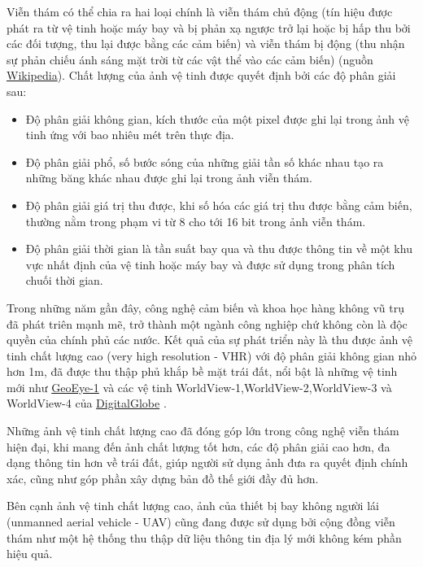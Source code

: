 \documentclass[14pt, oneside, a4paper, openany]{scrartcl}
\begin{document}
Viễn thám có thể chia ra hai loại chính là viễn thám chủ động (tín hiệu được phát ra từ vệ tinh hoặc máy bay và bị phản xạ ngược trở lại hoặc bị hấp thu bởi các đối tượng, thu lại được bằng các cảm biến) và viễn thám bị động (thu nhận sự phản chiếu ánh sáng mặt trời từ các vật thể vào các cảm biến) (nguồn \href{https://en.wikipedia.org/wiki/Remote_sensing}{Wikipedia})\cite{remotesens}.
Chất lượng của ảnh vệ tinh được quyết định bởi các độ phân giải sau:
\begin{itemize}
	\item Độ phân giải không gian, kích thước của một pixel được ghi lại trong ảnh vệ tinh ứng với bao nhiêu mét trên thực địa.
	\item Độ phân giải phổ, số bước sóng của những giải tần số khác nhau tạo ra những băng khác nhau được ghi lại trong ảnh viễn thám.
	\item Độ phân giải giá trị thu được, khi số hóa các giá trị thu được bằng cảm biến, thường nằm trong phạm vi từ 8 cho tới 16 bit trong ảnh viễn thám.
	\item Độ phân giải thời gian là tần suất bay qua và thu được thông tin về một khu vực nhất định của vệ tinh hoặc máy bay và được sử dụng trong phân tích chuối thời gian.
\end{itemize}
Trong những năm gần đây, công nghệ cảm biến và khoa học hàng không vũ trụ đã phát triên mạnh mẽ, trở thành một ngành công nghiệp chứ không còn là độc quyền của chính phủ các nước. Kết quả của sự phát triển này là thu được ảnh vệ tinh chất lượng cao   (very high resolution - VHR) với độ phân giải không gian nhỏ hơn 1m, đã được thu thập phủ khắp bề mặt trái đất, nổi bật là những vệ tinh mới như \href{http://www.satimagingcorp.com/gallery/geoeye-1/}{GeoEye-1} \cite{geoeye} và các vệ tinh WorldView-1,WorldView-2,WorldView-3 và WorldView-4 của \href{https://www.digitalglobe.com/}{DigitalGlobe} \cite{digiglob}.

Những ảnh vệ tinh chất lượng cao đã đóng góp lớn trong công nghệ viễn thám hiện đại, khi mang đến ảnh chất lượng tốt hơn, các độ phân giải cao hơn, đa dạng thông tin hơn về trái đất, giúp người sử dụng ảnh đưa ra quyết định chính xác, cũng như góp phần xây dựng bản đồ thế giới đầy đủ hơn.

Bên cạnh ảnh vệ tinh chất lượng cao, ảnh của thiết bị bay không người lái  (unmanned aerial vehicle - UAV) cũng đang được sử dụng bởi cộng đồng viễn thám như một hệ thống thu thập dữ liệu thông tin địa lý mới không kém phần hiệu quả.
\end{document}
